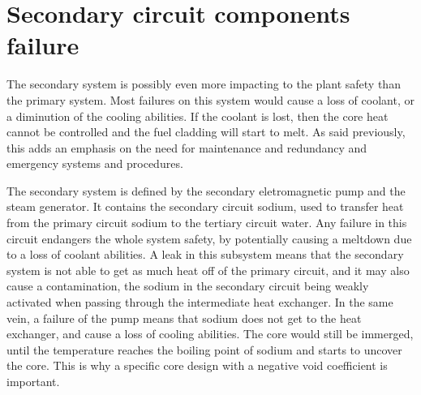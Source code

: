 \section{Secondary circuit components failure}
\label{sec3:secondary_failures}


The secondary system is possibly even more impacting to the plant safety than the primary system. Most failures on this system would cause a loss of coolant, or a diminution of the cooling abilities. If the coolant is lost, then the core heat cannot be controlled and the fuel cladding will start to melt. As said previously, this adds an emphasis on the need for maintenance and redundancy and emergency systems and procedures.

The secondary system is defined by the secondary eletromagnetic pump and the steam generator. It contains the secondary circuit sodium, used to transfer heat from the primary circuit sodium to the tertiary circuit water. Any failure in this circuit endangers the whole system safety, by potentially causing a meltdown due to a loss of coolant abilities. A leak in this subsystem means that the secondary system is not able to get as much heat off of the primary circuit, and it may also cause a contamination, the sodium in the secondary circuit being weakly activated when passing through the intermediate heat exchanger. In the same vein, a failure of the pump means that sodium does not get to the heat exchanger, and cause a loss of cooling abilities. The core would still be immerged, until the temperature reaches the boiling point of sodium and starts to uncover the core. This is why a specific core design with a negative void coefficient is important.


